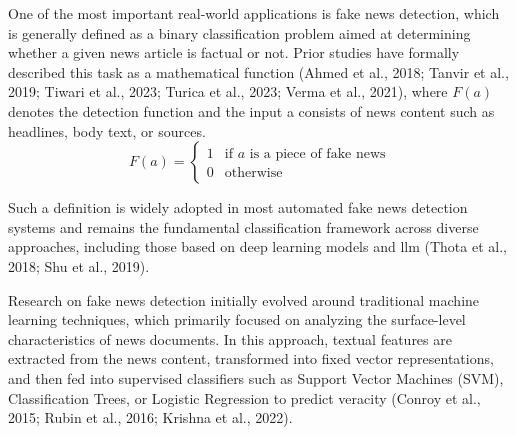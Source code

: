 \documentclass[a4paper,fleqn]{cas-sc}
\begin{document}
One of the most important real-world applications is fake news detection, which is generally defined as a binary classification problem aimed at determining whether a given news article is factual or not. Prior studies have formally described this task as a mathematical function (Ahmed et al., 2018; Tanvir et al., 2019; Tiwari et al., 2023; Turica et al., 2023; Verma et al., 2021), where \( F(a)\) denotes the detection function and the input a consists of news content such as headlines, body text, or sources.
\[
F(a) =
\begin{cases}
1 & \text{if } a \text{ is a piece of fake news} \\
0 & \text{otherwise}
\end{cases}
\]

Such a definition is widely adopted in most automated fake news detection systems and remains the fundamental classification framework across diverse approaches, including those based on deep learning models and \gls{llm} (Thota et al., 2018; Shu et al., 2019).

Research on fake news detection initially evolved around traditional machine learning techniques, which primarily focused on analyzing the surface-level characteristics of news documents. In this approach, textual features are extracted from the news content, transformed into fixed vector representations, and then fed into supervised classifiers such as Support Vector Machines (SVM), Classification Trees, or Logistic Regression to predict veracity (Conroy et al., 2015; Rubin et al., 2016; Krishna et al., 2022).
\end{document}
